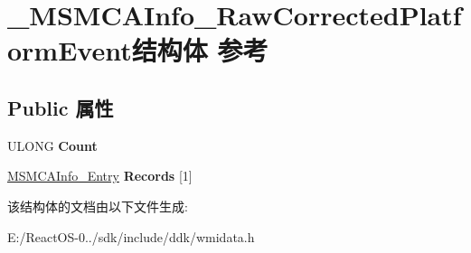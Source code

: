 \hypertarget{struct___m_s_m_c_a_info___raw_corrected_platform_event}{}\section{\+\_\+\+M\+S\+M\+C\+A\+Info\+\_\+\+Raw\+Corrected\+Platform\+Event结构体 参考}
\label{struct___m_s_m_c_a_info___raw_corrected_platform_event}
\subsection*{Public 属性}
\begin{DoxyCompactItemize}
\item 
\mbox{\label{struct___m_s_m_c_a_info___raw_corrected_platform_event_ac5d0a512d788b84c7c32b87989d49ed7}} 
U\+L\+O\+NG {\bfseries Count}
\item 
\mbox{\label{struct___m_s_m_c_a_info___raw_corrected_platform_event_a3eb33ff3d84e4882a5094da9f3530579}} 
\hyperlink{struct___m_s_m_c_a_info___entry}{M\+S\+M\+C\+A\+Info\+\_\+\+Entry} {\bfseries Records} \mbox{[}1\mbox{]}
\end{DoxyCompactItemize}


该结构体的文档由以下文件生成\+:\begin{DoxyCompactItemize}
\item 
E\+:/\+React\+O\+S-\/0../sdk/include/ddk/wmidata.\+h\end{DoxyCompactItemize}
